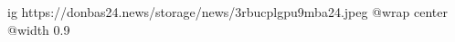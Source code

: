  
 
 
 
 

\ifcmt
  ig https://donbas24.news/storage/news/3rbucplgpu9mba24.jpeg
  @wrap center
  @width 0.9
\fi
